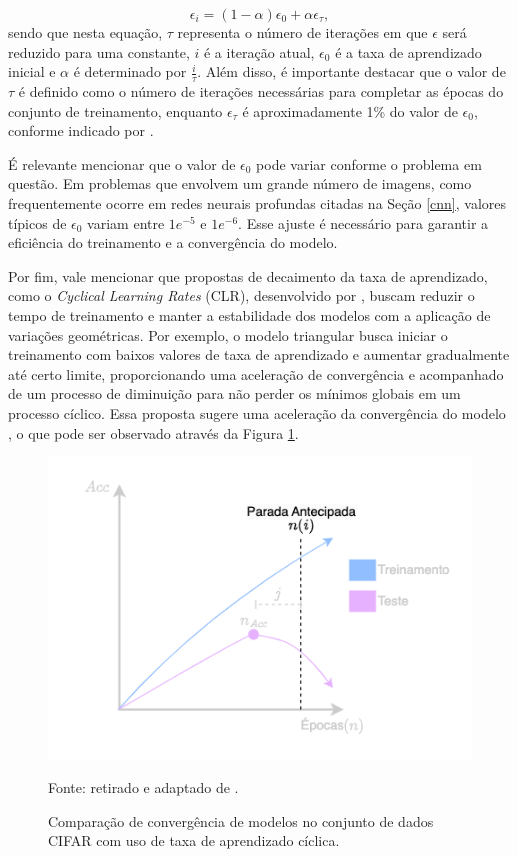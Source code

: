 \begin{equation}
\label{deep:eq:dynamic_lr}
\epsilon_i = (1 - \alpha) \epsilon_0 + \alpha\epsilon_\tau,
\end{equation}
sendo que nesta equação, $\tau$ representa o número de iterações em que $\epsilon$ será reduzido para uma constante, $i$ é a iteração atual, $\epsilon_0$ é a taxa de aprendizado inicial e $\alpha$ é determinado por $\frac{i}{\tau}$. Além disso, é importante destacar que o valor de $\tau$ é definido como o número de iterações necessárias para completar as épocas do conjunto de treinamento, enquanto $\epsilon_\tau$ é aproximadamente 1\% do valor de $\epsilon_0$, conforme indicado por \cite{Goodfellow2016}.

É relevante mencionar que o valor de $\epsilon_0$ pode variar conforme o problema em questão. Em problemas que envolvem um grande número de imagens, como frequentemente ocorre em redes neurais profundas citadas na Seção \ref{cnn}, valores típicos de $\epsilon_0$ variam entre $1e^{-5}$ e $1e^{-6}$. Esse ajuste é necessário para garantir a eficiência do treinamento e a convergência do modelo.

Por fim, vale mencionar que propostas de decaimento da taxa de aprendizado, como o \textit{Cyclical Learning Rates} (CLR), desenvolvido por \cite{Smith2017CyclicalNetworks}, buscam reduzir o tempo de treinamento e manter a estabilidade dos modelos com a aplicação de variações geométricas. Por exemplo, o modelo triangular busca iniciar o treinamento com baixos valores de taxa de aprendizado e aumentar gradualmente até certo limite, proporcionando uma aceleração de convergência e acompanhado de um processo de diminuição para não perder os mínimos globais em um processo cíclico. Essa proposta sugere uma aceleração da convergência do modelo \citep{Smith2017CyclicalNetworks}, o que pode ser observado através da Figura \ref{deep:optimization:cyclical_lr}.

\begin{figure}[H]
    \centering
    \caption{Comparação de convergência de modelos no conjunto de dados CIFAR \citep{Krizhevsky2014TheDataset} com uso de taxa de aprendizado cíclica.}
    \includegraphics[width=0.8\linewidth]{recursos/imagens/deep/early_stopping.png}
    \label{deep:optimization:cyclical_lr}

    Fonte: retirado e adaptado de \cite{Smith2017CyclicalNetworks}.
\end{figure}

